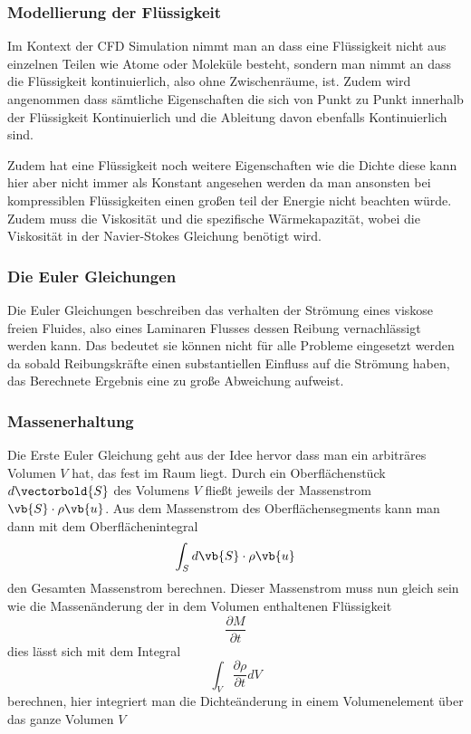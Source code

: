 \subsubsection{Modellierung der Flüssigkeit}
Im Kontext der CFD Simulation nimmt man an dass eine Flüssigkeit nicht aus einzelnen Teilen wie Atome oder Moleküle besteht, sondern man nimmt an dass die Flüssigkeit kontinuierlich, also ohne Zwischenräume, ist. 
Zudem wird angenommen dass sämtliche Eigenschaften die sich von Punkt zu Punkt innerhalb der Flüssigkeit Kontinuierlich und die Ableitung davon ebenfalls Kontinuierlich sind. 

Zudem hat eine Flüssigkeit noch weitere Eigenschaften wie die Dichte diese kann hier aber nicht immer als Konstant angesehen werden da man ansonsten bei kompressiblen Flüssigkeiten einen großen teil der Energie nicht beachten würde.
Zudem muss die Viskosität und die spezifische Wärmekapazität, wobei die Viskosität in der Navier-Stokes Gleichung benötigt wird.

\subsubsection{Die Euler Gleichungen}
Die Euler Gleichungen beschreiben das verhalten der Strömung eines viskose freien Fluides, also eines Laminaren Flusses dessen Reibung vernachlässigt werden kann. 
Das bedeutet sie können nicht für alle Probleme eingesetzt werden da sobald Reibungskräfte einen substantiellen Einfluss auf die Strömung haben, das Berechnete Ergebnis eine zu große Abweichung aufweist.

\subsubsection{Massenerhaltung}
Die Erste Euler Gleichung geht aus der Idee hervor dass man ein arbiträres Volumen $V$ hat, das fest im Raum liegt. Durch ein Oberflächenstück 
$d \vectorbold{S} $ 
des Volumens 
$V$
 fließt jeweils der Massenstrom 
$\vb{S} \cdot\rho\vb{u}$.
Aus dem Massenstrom des Oberflächensegments kann man dann mit dem Oberflächenintegral 
\[\int_{S}d\vb{S}\cdot\rho\vb{u}\]
den Gesamten Massenstrom berechnen. Dieser Massenstrom muss nun gleich sein wie die Massenänderung der in dem Volumen enthaltenen Flüssigkeit 
\[\frac{\partial M}{\partial t}\]
dies lässt sich mit dem Integral 
\[\int_{V}\frac{\partial \rho}{\partial t} dV\]
berechnen, hier integriert man die Dichteänderung in einem Volumenelement über das ganze Volumen 
$V$ 

